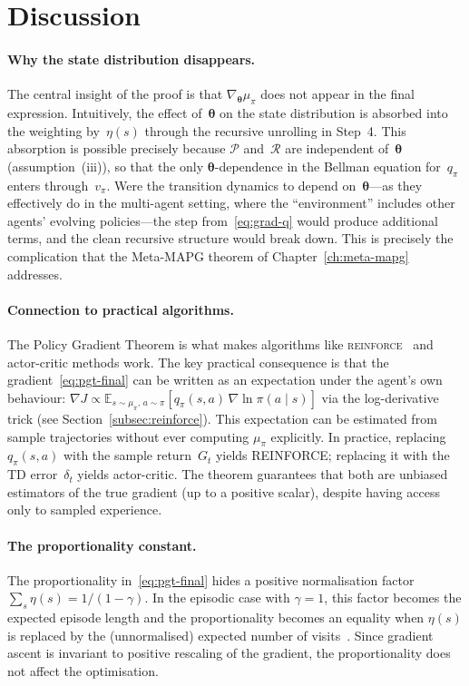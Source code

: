 \section{Discussion}
\label{sec:ch4-discussion}

\paragraph{Why the state distribution disappears.} The central insight of the proof is that $\nabla_{\bm{\theta}}\mu_\pi$ does not appear in the final expression. Intuitively, the effect of~$\bm{\theta}$ on the state distribution is absorbed into the weighting by~$\eta(s)$ through the recursive unrolling in Step~4. This absorption is possible precisely because $\mathcal{P}$ and~$\mathcal{R}$ are independent of~$\bm{\theta}$ (assumption~(iii)), so that the only $\bm{\theta}$-dependence in the Bellman equation for~$q_\pi$ enters through~$v_\pi$. Were the transition dynamics to depend on~$\bm{\theta}$---as they effectively do in the multi-agent setting, where the ``environment'' includes other agents' evolving policies---the step from~\eqref{eq:grad-q} would produce additional terms, and the clean recursive structure would break down. This is precisely the complication that the Meta-MAPG theorem of Chapter~\ref{ch:meta-mapg} addresses.

\paragraph{Connection to practical algorithms.} The Policy Gradient Theorem is what makes algorithms like \textsc{reinforce}~\cite{williams1992} and actor-critic methods work. The key practical consequence is that the gradient~\eqref{eq:pgt-final} can be written as an expectation under the agent's own behaviour: $\nabla J \propto \mathbb{E}_{s\sim\mu_\pi,\,a\sim\pi}[q_\pi(s,a)\,\nabla\ln\pi(a\mid s)]$ via the log-derivative trick (see Section~\ref{subsec:reinforce}). This expectation can be estimated from sample trajectories without ever computing $\mu_\pi$ explicitly. In practice, replacing $q_\pi(s,a)$ with the sample return~$G_t$ yields REINFORCE; replacing it with the TD error~$\delta_t$ yields actor-critic. The theorem guarantees that both are unbiased estimators of the true gradient (up to a positive scalar), despite having access only to sampled experience.

\paragraph{The proportionality constant.} The proportionality in~\eqref{eq:pgt-final} hides a positive normalisation factor $\sum_s\eta(s) = 1/(1-\gamma)$. In the episodic case with $\gamma=1$, this factor becomes the expected episode length and the proportionality becomes an equality when $\eta(s)$ is replaced by the (unnormalised) expected number of visits~\cite{sutton2018rl}. Since gradient ascent is invariant to positive rescaling of the gradient, the proportionality does not affect the optimisation.
